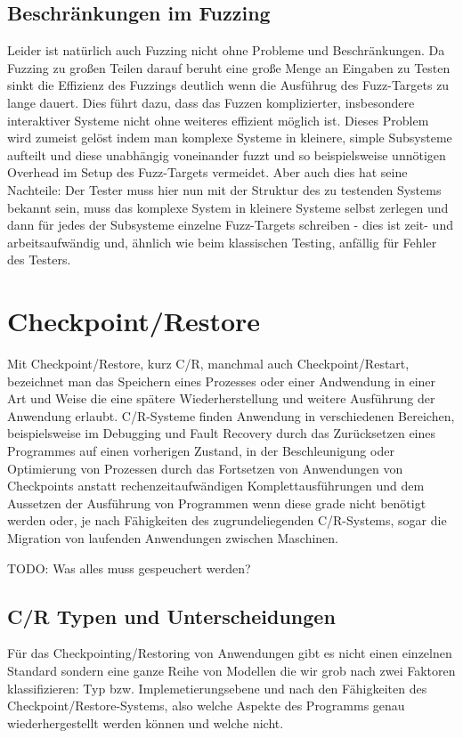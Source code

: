 \documentclass[12pt]{scrartcl}
\begin{document}
\subsection{Beschränkungen im Fuzzing}
Leider ist natürlich auch Fuzzing nicht ohne Probleme und Beschränkungen. Da Fuzzing zu großen Teilen darauf beruht eine große Menge an Eingaben zu Testen sinkt die Effizienz des Fuzzings deutlich wenn die Ausführug des Fuzz-Targets zu lange dauert. Dies führt dazu, dass das Fuzzen komplizierter, insbesondere interaktiver Systeme nicht ohne weiteres effizient möglich ist. Dieses Problem wird zumeist gelöst indem man komplexe Systeme in kleinere, simple Subsysteme aufteilt und diese unabhängig voneinander fuzzt und so beispielsweise unnötigen Overhead im Setup des Fuzz-Targets vermeidet. Aber auch dies hat seine Nachteile: Der Tester muss hier nun mit der Struktur des zu testenden Systems bekannt sein, muss das komplexe System in kleinere Systeme selbst zerlegen und dann für jedes der Subsysteme einzelne Fuzz-Targets schreiben - dies ist zeit- und arbeitsaufwändig und, ähnlich wie beim klassischen Testing, anfällig für Fehler des Testers. 

\section{Checkpoint/Restore}

Mit Checkpoint/Restore, kurz C/R, manchmal auch Checkpoint/Restart, bezeichnet man das Speichern eines Prozesses oder einer Andwendung in einer Art und Weise die eine spätere Wiederherstellung und weitere Ausführung der Anwendung erlaubt.
C/R-Systeme finden Anwendung in verschiedenen Bereichen, beispielsweise im Debugging und Fault Recovery durch das Zurücksetzen eines Programmes auf einen vorherigen Zustand, in der Beschleunigung oder Optimierung von Prozessen durch das Fortsetzen von Anwendungen von Checkpoints anstatt rechenzeitaufwändigen Komplettausführungen und dem Aussetzen der Ausführung von Programmen wenn diese grade nicht benötigt werden oder, je nach Fähigkeiten des zugrundeliegenden C/R-Systems, sogar die Migration von laufenden Anwendungen zwischen Maschinen.

TODO: Was alles muss gespeuchert werden? 

\subsection{C/R Typen und Unterscheidungen}
Für das Checkpointing/Restoring von Anwendungen gibt es nicht einen einzelnen Standard sondern eine ganze Reihe von Modellen die wir grob nach zwei Faktoren klassifizieren: Typ bzw. Implemetierungsebene und nach den Fähigkeiten des Checkpoint/Restore-Systems, also welche Aspekte des Programms genau wiederhergestellt werden können und welche nicht.
\end{document}
